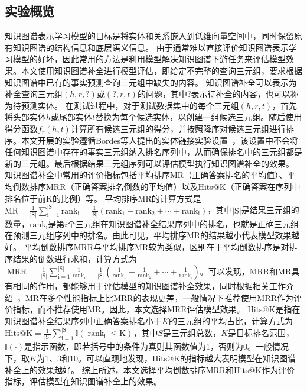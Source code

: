 \documentclass[algorithmlist, AutoFakeBold, AutoFakeSlant, figurelist, tablelist, nomlist, masters]{seuthesix}
\begin{document}
\subsection{实验概览}
知识图谱表示学习模型的目标是将实体和关系嵌入到低维向量空间中，同时保留原有知识图谱的结构信息和底层语义信息。
由于通常难以直接评价知识图谱表示学习模型的好坏，因此常用的方法是利用模型解决知识图谱下游任务来评估模型效果。本文使用知识图谱补全进行模型评估，即给定不完整的查询三元组，要求根据知识图谱中已有的事实预测查询三元组中缺失的内容。
知识图谱补全可以表示为补全查询三元组$\left(h, r, ?\right)$或$\left(?, r, t\right)$的问题，其中$?$表示待补全的内容，也可以称为待预测实体。
在测试过程中，对于测试数据集中的每个三元组$\left(h, r, t\right)$，首先将头部实体$h$或尾部实体$t$替换为每个候选实体，以创建一组候选三元组。随后使用得分函数$f_r\left(h, t\right)$计算所有候选三元组的得分，并按照降序对候选三元组进行排序。本文开展的实验遵循Bordes等人提出的实体链接实验设置~\cite{bordes2013translating}，该设置中不会将任何知识图谱中存在的事实三元组纳入排名序列中，从而确保排名中的三元组都是新的三元组。最后根据结果三元组序列可以评估模型执行知识图谱补全的效果。
知识图谱补全中常用的评价指标包括平均排序MR（正确答案排名的平均值）、平均倒数排序MRR（正确答案排名倒数的平均值）以及Hits@K（正确答案在序列中排名位于前K的比例）等。
平均排序MR的计算方式是$\mathrm{MR}=\frac{1}{|\mathrm{S}|} \sum_{\mathrm{i}=1}^{|\mathrm{S}|} \mathrm{rank}_{\mathrm{i}}=\frac{1}{|\mathrm{S}|}\left(\mathrm{rank}_1+\mathrm{rank}_2+\cdots+\mathrm{rank}_{\mathrm{i}}\right)$，其中$|\mathrm{S}|$是结果三元组的数量，$\mathrm{rank}_{\mathrm{i}}$是第$i$个三元组在知识图谱补全结果序列中的排名，也就是正确三元组在预测三元组序列中的排名。由此可见，平均排序MR的结果越小代表模型效果越好。
平均倒数排序MRR与平均排序MR较为类似，区别在于平均倒数排序是对排序结果的倒数进行求和，计算方式为$\operatorname{MRR}=\frac{1}{|\mathrm{S}|} \sum_{\mathrm{i}=1}^{|\mathrm{S}|} \frac{1}{\mathrm{rank}_{\mathrm{i}}}=\frac{1}{|\mathrm{S}|}\left(\frac{1}{\mathrm{rank}_1}+\frac{1}{\mathrm{rank}_2}+\cdots+\frac{1}{\mathrm{rank}_{\mathrm{i}}}\right)$。可以发现，MRR和MR具有相同的作用，都能够用于评估模型的知识图谱补全效果，同时根据相关工作介绍~\cite{hoyt2022unified}，MR在多个性能指标上比MRR的表现更差，一般情况下推荐使用MRR作为评价指标，而不推荐使用MR。因此，本文选择MRR评估模型效果。
Hits@K是指在知识图谱补全结果序列中正确答案排名小于$K$的三元组的平均占比，计算方式为$\mathrm{Hits@K}=\frac{1}{|\mathrm{S}|} \sum_{\mathrm{i}=1}^{|\mathrm{S}|} \mathbb{I}\left(\operatorname{rank}_{\mathrm{i}} \leq \mathrm{K}\right)$，其中$S$是三元组总数，$K$是目标排名范围，$\mathbb{I}\left(\cdot\right)$是指示函数，即若括号中的条件为真则其函数值为1，否则为0。一般情况下，取$K$为1、3和10。可以直观地发现，Hits@K的指标越大表明模型在知识图谱补全上的效果越好。
综上所述，本文选择平均倒数排序MRR和Hits@K作为评价指标，评估模型在知识图谱补全上的效果。
\end{document}
